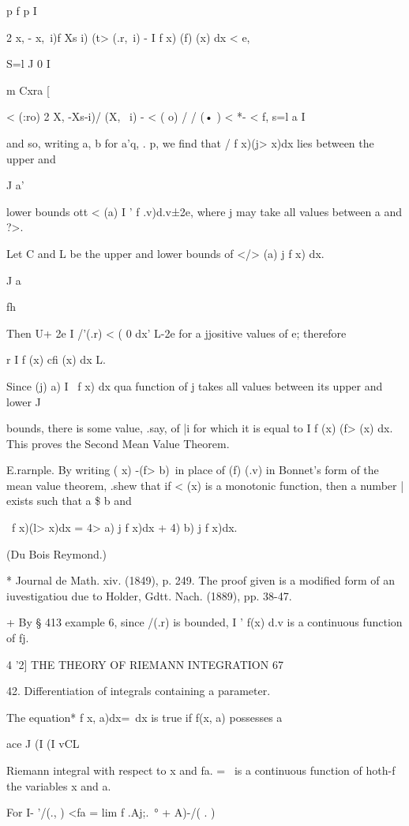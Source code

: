 p f p I

2 x, - x,\ i)f Xs i) (t> (.r,\ i) - I f x) (f) (x) dx < e,

S=l J 0 I

m Cxra [

< (:ro) 2 X, -Xs-i)/ (X, \ i) - < ( o) / / (• ) < *- < f, s=l a I

and so, writing a, b for a'q, . p, we find that / f x)(j> x)dx lies
between the upper and

J a'

lower bounds ott < (a) I ' f .v)d.v±2e, where j may take all values
between a and ?>.

Let C and L be the upper and lower bounds of </> (a) j f x) dx.

J a

fh

Then U+ 2e I /'(.r) < ( 0 dx' L-2e for a jjositive values of e;
therefore

r I f (x) cfi (x) dx L.

Since (j) a) I \ f x) dx qua function of j takes all values between
its upper and lower J

bounds, there is some value, .say, of |i for which it is equal to I f
(x) (f> (x) dx. This proves the Second Mean Value Theorem.

E.rarnple. By writing ( x) -(f> b)\ in place of (f) (.v) in Bonnet's
form of the mean value theorem, .shew that if < (x) is a monotonic
function, then a number | exists such that a \$ b and

\ f x)(l> x)dx = 4> a) j f x)dx + 4) b) j f x)dx.

(Du Bois Reymond.)

* Journal de Math. xiv. (1849), p. 249. The proof given is a modified
form of an iuvestigatiou due to Holder, Gdtt. Nach. (1889), pp. 38-47.

+ By § 413 example 6, since /(.r) is bounded, I ' f(x) d.v is a
continuous function of fj.



4 '2] THE THEORY OF RIEMANN INTEGRATION 67

42. Differentiation of integrals containing a parameter.

The equation* f x, a)dx=\ dx is true if f(x, a) possesses a

ace J (I (I vCL

Riemann integral with respect to x and fa. = \ is a continuous
function of hoth-f the variables x and a.

For I- '/(., ) <fa = lim f .Aj;.\ ° + A)-/( . )

